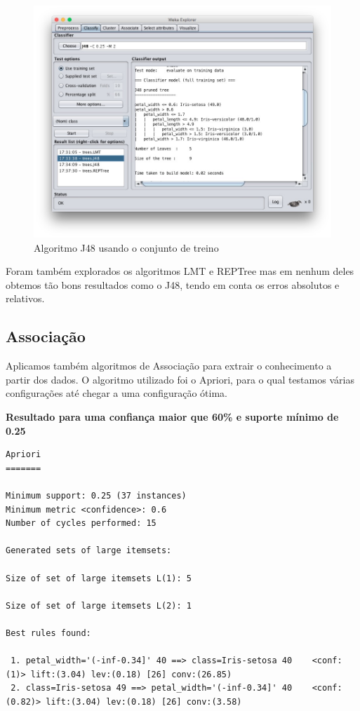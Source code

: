 \begin{figure}[H]
    \centering
    \includegraphics[scale=0.3]{tex/img/eesta.jpg}
    \caption{Algoritmo J48 usando o conjunto de treino}
    \label{fig:apos1}
\end{figure}



Foram também explorados os algoritmos LMT e REPTree mas em nenhum deles obtemos tão bons resultados como o J48, tendo em conta os erros absolutos e relativos.

\subsection{Associação}


Aplicamos também algoritmos de Associação para extrair o conhecimento a partir dos dados. O algoritmo utilizado foi o Apriori, para o qual testamos várias configurações até chegar a uma configuração ótima.

\textbf{Resultado para uma confiança maior que 60\% e suporte mínimo de 0.25}


\begin{lstlisting}[breaklines,frame=single]
Apriori
=======

Minimum support: 0.25 (37 instances)
Minimum metric <confidence>: 0.6
Number of cycles performed: 15

Generated sets of large itemsets:

Size of set of large itemsets L(1): 5

Size of set of large itemsets L(2): 1

Best rules found:

 1. petal_width='(-inf-0.34]' 40 ==> class=Iris-setosa 40    <conf:(1)> lift:(3.04) lev:(0.18) [26] conv:(26.85)
 2. class=Iris-setosa 49 ==> petal_width='(-inf-0.34]' 40    <conf:(0.82)> lift:(3.04) lev:(0.18) [26] conv:(3.58)
\end{lstlisting}


